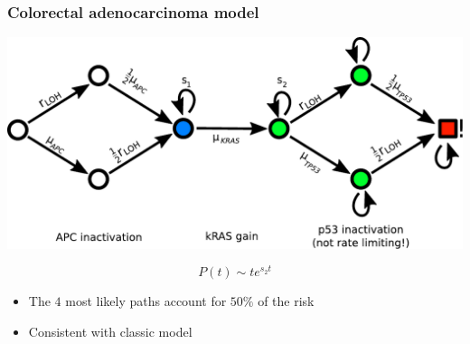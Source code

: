 \documentclass{beamer}
\begin{document}
\begin{frame}
    \frametitle{Colorectal adenocarcinoma model}

    \begin{center}
        \includegraphics[width=1.0\textwidth]{figures/diagram7}
    \end{center}

    \begin{equation*}
        P(t) \sim t e^{s_2 t}
    \end{equation*}
    \begin{center}
    \begin{itemize}
        \item The $4$ most likely paths account for $50\%$ of the risk
        \item Consistent with classic model\footnotemark[2]
    \end{itemize}
    \end{center}
\end{frame}
\end{document}
